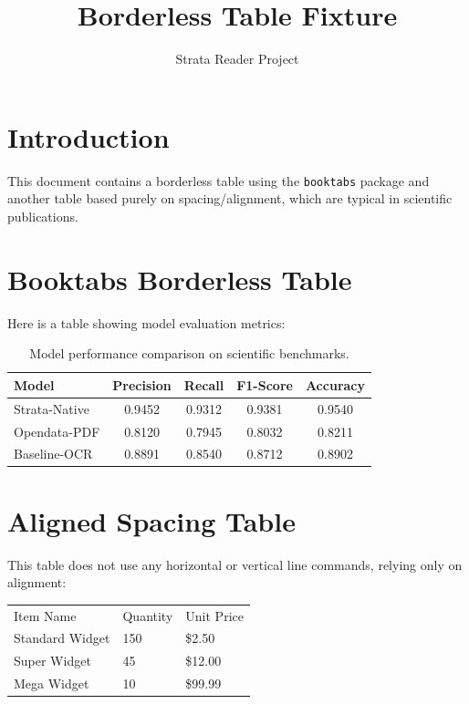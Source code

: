 \documentclass{article}
\title{Borderless Table Fixture}
\author{Strata Reader Project}
\begin{document}
\maketitle

\section{Introduction}
This document contains a borderless table using the \texttt{booktabs} package and another table based purely on spacing/alignment, which are typical in scientific publications.

\section{Booktabs Borderless Table}
Here is a table showing model evaluation metrics:

\begin{table}[h]
\centering
\begin{tabular}{lcccc}
\toprule
Model & Precision & Recall & F1-Score & Accuracy \\
\midrule
Strata-Native & 0.9452 & 0.9312 & 0.9381 & 0.9540 \\
Opendata-PDF & 0.8120 & 0.7945 & 0.8032 & 0.8211 \\
Baseline-OCR & 0.8891 & 0.8540 & 0.8712 & 0.8902 \\
\bottomrule
\end{tabular}
\caption{Model performance comparison on scientific benchmarks.}
\end{table}

\newpage
\section{Aligned Spacing Table}
This table does not use any horizontal or vertical line commands, relying only on alignment:

\begin{center}
\begin{tabular}{lll}
Item Name & Quantity & Unit Price \\
Standard Widget & 150 & \$2.50 \\
Super Widget & 45 & \$12.00 \\
Mega Widget & 10 & \$99.99 \\
\end{tabular}
\end{center}
\end{document}
